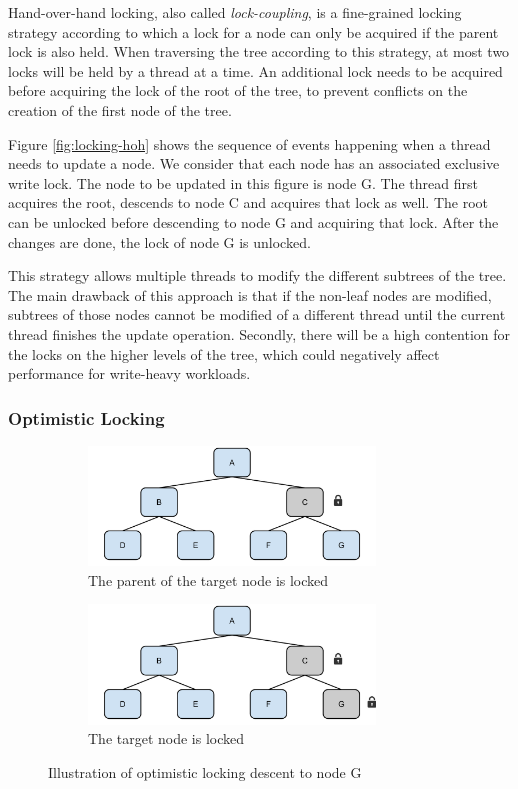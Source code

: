 \documentclass[11pt,a4paper]{globis-book}
\begin{document}
Hand-over-hand locking, also called \textit{lock-coupling}, is a fine-grained locking strategy according to which a lock for a node can only be acquired if the parent lock is also held. When traversing the tree according to this strategy, at most two locks will be held by a thread at a time. An additional lock needs to be acquired before acquiring the lock of the root of the tree, to prevent conflicts on the creation of the first node of the tree. 

Figure \ref{fig:locking-hoh} shows the sequence of events happening when a thread needs to update a node. We consider that each node has an associated exclusive write lock. The node to be updated in this figure is node G. The thread first acquires the root, descends to node C and acquires that lock as well. The root can be unlocked before descending to node G and acquiring that lock. After the changes are done, the lock of node G is unlocked.

This strategy allows multiple threads to modify the different subtrees of the tree. The main drawback of this approach is that if the non-leaf nodes are modified, subtrees of those nodes cannot be modified of a different thread until the current thread finishes the update operation. Secondly, there will be a high contention for the locks on the higher levels of the tree, which could negatively affect performance for write-heavy workloads. 

\subsubsection{Optimistic Locking}

\begin{figure}
    \centering
    \begin{subfigure}[b]{0.5\linewidth}
        \includegraphics[width = 3in]{images/Tree-HoH-c}
        \caption{The parent of the target node is locked}
    \end{subfigure}%
    \begin{subfigure}[b]{0.5\linewidth}
        \includegraphics[width = 3in]{images/Tree-HoH-d}
        \caption{The target node is locked}
    \end{subfigure}
    \caption{Illustration of optimistic locking descent to node G}
    \label{fig:locking-ol}
\end{figure}
\end{document}

